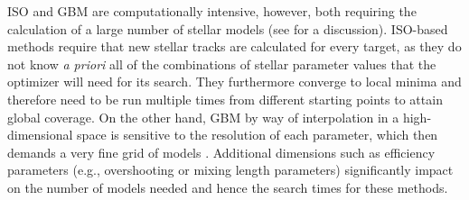 \documentclass[twocolumn,twocolappendix]{aastex6}
\begin{document}
ISO and GBM are computationally intensive, however, both requiring the calculation of a large number of stellar models (see \citealt{2009ApJ...699..373M} for a discussion).
ISO-based methods require that new stellar tracks are calculated for every target, as they do not know \emph{a priori} all of the combinations of stellar parameter values that the optimizer will need for its search. They furthermore converge to local minima and therefore need to be run multiple times from different starting points to attain global coverage. %
On the other hand, GBM by way of interpolation in a high-dimensional space is sensitive to the resolution of each parameter, which then demands a very fine grid of models \citep[see e.g.][who uses more than five million models to search through a grid varied in 4 initial parameters]{2010ApJ...725.2176Q}. Additional dimensions such as efficiency parameters (e.g.\@, overshooting or mixing length parameters) significantly impact on the number of models needed and hence the search times for these methods. 



\end{document}

